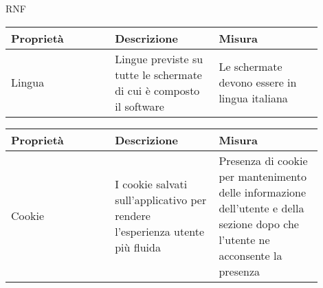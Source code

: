 \begin{listaPersonale}{RNF}
    \begin{tabular}{|p{0.3\linewidth}|p{0.3\linewidth}|p{0.3\linewidth}|}
        \hline
        \rowcolor{viola} \textbf{Proprietà} &
        \textbf{Descrizione}                &
        \textbf{Misura}                       \\
        \hline
        Lingua                              &
        Lingue previste su tutte le
        schermate di cui è composto
        il software                         &
        Le schermate devono
        essere in lingua italiana             \\
        \hline
    \end{tabular}

    \begin{tabular}{|p{0.3\linewidth}|p{0.3\linewidth}|p{0.3\linewidth}|}
        \hline
        \rowcolor{viola} \textbf{Proprietà} &
        \textbf{Descrizione}                &
        \textbf{Misura}                       \\
        \hline
        Cookie                              &
        I cookie salvati sull'applicativo
        per rendere l'esperienza utente
        più fluida                          &
        Presenza di cookie per mantenimento
        delle informazione dell'utente e
        della sezione dopo che l'utente
        ne acconsente la presenza             \\
        \hline
    \end{tabular}

\end{listaPersonale}